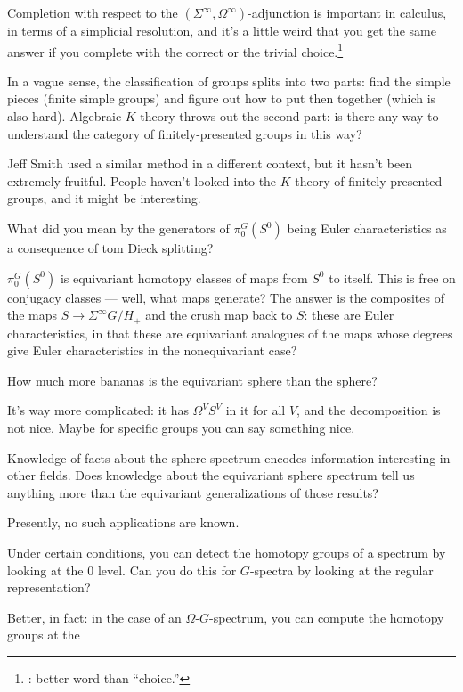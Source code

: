 Completion with respect to the $(\Sigma^\infty, \Omega^\infty)$-adjunction is important in calculus, in terms of a
simplicial resolution, and it's a little weird that you get the same answer if you complete with the correct or the
trivial choice.\footnote{\TODO: better word than ``choice.''}
\begin{ques}
In a vague sense, the classification of groups splits into two parts: find the simple pieces (finite simple
groups) and figure out how to put then together (which is also hard). Algebraic $K$-theory throws out the second
part: is there any way to understand the category of finitely-presented groups in this way?
\end{ques}
Jeff Smith used a similar method in a different context, but it hasn't been extremely fruitful. People haven't
looked into the $K$-theory of finitely presented groups, and it might be interesting.
\begin{ques}
What did you mean by the generators of $\pi_0^G(S^0)$ being Euler characteristics as a consequence of tom Dieck
splitting?
\end{ques}
$\pi_0^G(S^0)$ is equivariant homotopy classes of maps from $S^0$ to itself. This is free on conjugacy classes ---
well, what maps generate? The answer is the composites of the maps $S\to\Sigma^\infty G/H_+$ and the crush map back
to $S$: these are Euler characteristics, in that these are equivariant analogues of the maps whose degrees give
Euler characteristics in the nonequivariant case?
\begin{ques}
How much more bananas is the equivariant sphere than the sphere?
\end{ques}
It's way more complicated: it has $\Omega^V S^V$ in it for all $V$, and the decomposition is not nice. Maybe for
specific groups you can say something nice.
\begin{ques}
Knowledge of facts about the sphere spectrum encodes information interesting in other fields. Does knowledge about
the equivariant sphere spectrum tell us anything more than the equivariant generalizations of those results?
\end{ques}
Presently, no such applications are known.
\begin{ques}
Under certain conditions, you can detect the homotopy groups of a spectrum by looking at the $0$ level. Can you do
this for $G$-spectra by looking at the regular representation?
\end{ques}
Better, in fact: in the case of an $\Omega$-$G$-spectrum, you can compute the homotopy groups at the
